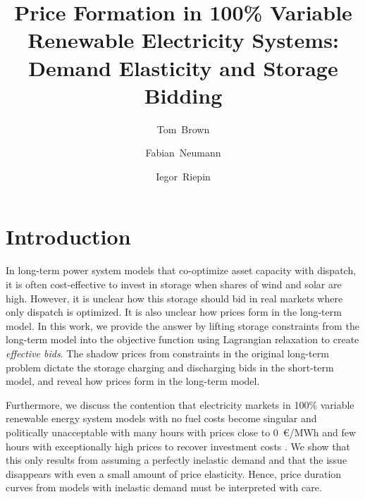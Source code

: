 \documentclass[final,3p]{elsarticle}
\begin{document}
\begin{frontmatter}

	\title{Price Formation in 100\% Variable Renewable Electricity Systems:\\Demand Elasticity and Storage Bidding}
  
	\author[tub]{Tom~Brown}
	\author[tub]{Fabian~Neumann}
	\author[tub]{Iegor~Riepin}
  
	\address[tub]{Department of Digital Transformation in Energy Systems, Institute of Energy Technology, Technische Universität Berlin (TUB), Einsteinufer 25 (TA 8), 10587, Berlin, Germany}
  

  \end{frontmatter}

\section*{Introduction}

In long-term power system models that co-optimize asset capacity with dispatch,
it is often cost-effective to invest in storage when shares of wind and solar
are high. However, it is unclear how this storage should bid in real markets
where only dispatch is optimized. It is also unclear how prices form in the
long-term model. In this work, we provide the answer by lifting storage
constraints from the long-term model into the objective function using
Lagrangian relaxation to create \textit{effective bids}. The shadow prices from
constraints in the original long-term problem dictate the storage charging and
discharging bids in the short-term model, and reveal how prices form in the
long-term model.

Furthermore, we discuss the contention that electricity markets in 100\%
variable renewable energy system models with no fuel costs become singular and
politically unacceptable with many hours with prices close to 0~\euro/MWh and
few hours with exceptionally high prices to recover investment costs
\cite{jungePropertiesDeeply2022,levinEnergyStorage2023,taylorPowerSystems2015}. We show that this only results from assuming a
perfectly inelastic demand and that the issue disappears with even a small
amount of price elasticity. Hence, price duration curves from models with
inelastic demand must be interpreted with care.
\end{document}

